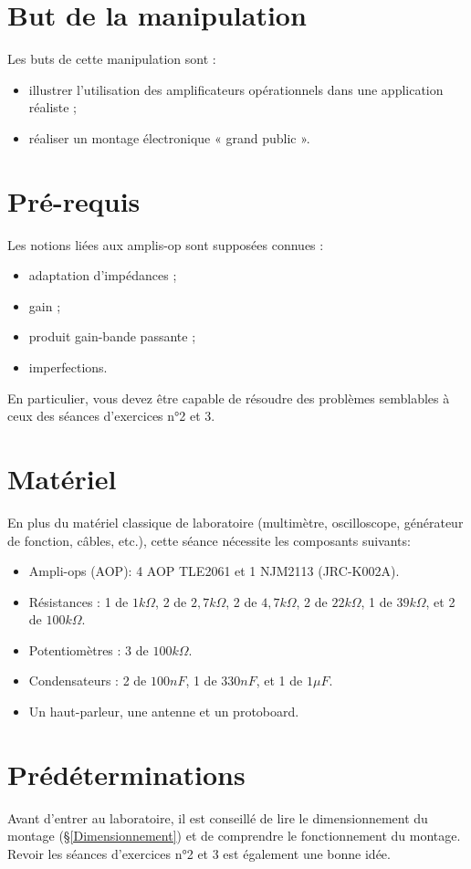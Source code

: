 \documentclass{../template/labo}
\author{The Fantastic Four}
\begin{document}

\section{But de la manipulation}

Les buts de cette manipulation sont :
\begin{itemize}
	\item illustrer l'utilisation des amplificateurs opérationnels dans une application réaliste ;
	\item réaliser un montage électronique « grand public ».
\end{itemize}

\section{Pré-requis}
Les notions liées aux amplis-op sont supposées connues :
\begin{itemize}
\item adaptation d'impédances ;
\item gain ;
\item produit gain-bande passante ;
\item imperfections.
\end{itemize}
En particulier, vous devez être capable de résoudre des problèmes semblables à ceux des séances d'exercices n°2 et 3.

\section{Matériel}
En plus du matériel classique de laboratoire (multimètre, oscilloscope, générateur de fonction, câbles, etc.), cette séance nécessite les composants suivants:
\begin{itemize}
\item Ampli-ops (AOP): 4 AOP TLE2061 et 1 NJM2113 (JRC-K002A).
\item Résistances : 1 de $1k\Omega$, 2 de $2,7k\Omega$, 2 de $4,7k\Omega$, 2 de $22k\Omega$, 1 de $39k\Omega$, et 2 de $100k\Omega$.
\item Potentiomètres : 3 de $100k\Omega$.
\item Condensateurs : 2 de $100nF$, 1 de $330nF$, et 1 de $1\mu F$.
\item Un haut-parleur, une antenne et un protoboard.
\end{itemize}

\newpage
\section{Prédéterminations} %
Avant d'entrer au laboratoire, il est conseillé de lire le dimensionnement du montage (§\ref{Dimensionnement}) et de comprendre le
fonctionnement du montage. Revoir les séances d'exercices n°2 et 3 est également une bonne idée.
\end{document}
